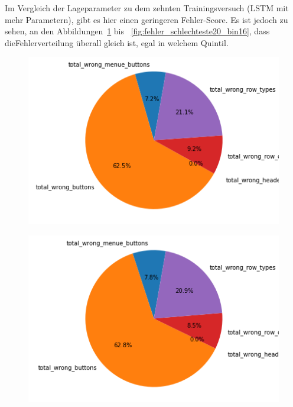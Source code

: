 \documentclass[pdftex,a4paper,halfparskip, article]{scrartcl}
\begin{document}
Im Vergleich der Lageparameter zu dem zehnten Trainingsversuch (LSTM mit mehr Parametern), gibt es hier einen geringeren Fehler-Score. Es ist jedoch zu sehen, an den Abbildungen~\ref{fig:fehler_gesamt_bin16} bis ~\ref{fig:fehler_schlechteste20_bin16}, dass dieFehlerverteilung überall gleich ist, egal in welchem Quintil.

\begin{figure}
\centering
\begin{minipage}{.33\textwidth}
  \centering
  \includegraphics[width=1\linewidth]{predictions_bin16_total_error_types_pie_chart}
  \label{fig:fehler_gesamt_bin16}
\end{minipage}%
\begin{minipage}{.33\textwidth}
  \centering
  \includegraphics[width=1\linewidth]{predictions_bin16_excluded_p80_error_types_pie_chart}

\end{minipage}
\end{figure}
\end{document}
